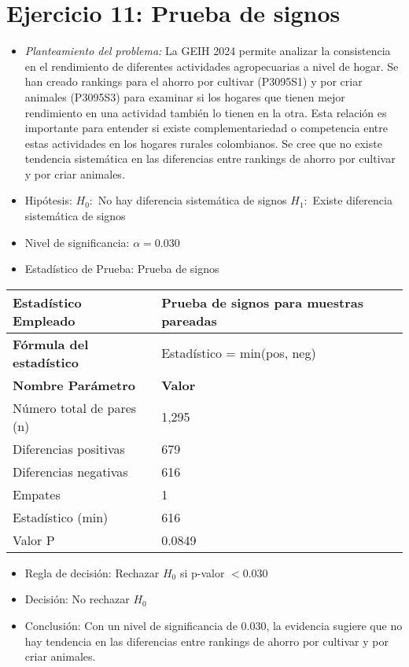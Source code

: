 \documentclass[12pt,a4paper]{article}
\begin{document}
\section*{Ejercicio 11: Prueba de signos}
\begin{itemize}
    \item \textit{Planteamiento del problema:} La GEIH 2024 permite analizar la consistencia en el rendimiento de diferentes actividades agropecuarias a nivel de hogar. Se han creado rankings para el ahorro por cultivar (P3095S1) y por criar animales (P3095S3) para examinar si los hogares que tienen mejor rendimiento en una actividad también lo tienen en la otra. Esta relación es importante para entender si existe complementariedad o competencia entre estas actividades en los hogares rurales colombianos. Se cree que no existe tendencia sistemática en las diferencias entre rankings de ahorro por cultivar y por criar animales.
    \item Hipótesis: \quad $H_{0}:$ No hay diferencia sistemática de signos \hspace{1cm} $H_{1}:$ Existe diferencia sistemática de signos
    \item Nivel de significancia: $\alpha = 0.030$
    \item Estadístico de Prueba: Prueba de signos
\end{itemize}

\begin{tabular}{|m{7cm}|m{7cm}|}
\hline
\textbf{Estadístico Empleado} & Prueba de signos para muestras pareadas \\ \hline
\textbf{Fórmula del estadístico} & Estadístico = min(pos, neg) \\ \hline
\textbf{Nombre Parámetro} & \textbf{Valor} \\ \hline
Número total de pares (n) & 1,295 \\ \hline
Diferencias positivas & 679 \\ \hline
Diferencias negativas & 616 \\ \hline
Empates & 1 \\ \hline
Estadístico (min) & 616 \\ \hline
Valor P & 0.0849 \\ \hline
\end{tabular}

\begin{itemize}
    \item Regla de decisión: Rechazar $H_0$ si p-valor $< 0.030$
    \item Decisión: No rechazar $H_0$
    \item Conclusión: Con un nivel de significancia de 0.030, la evidencia sugiere que no hay tendencia en las diferencias entre rankings de ahorro por cultivar y por criar animales.
\end{itemize}
\end{document}
